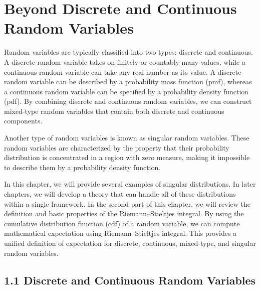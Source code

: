 \section*{Beyond Discrete and Continuous Random Variables}

Random variables are typically classified into two types: discrete and continuous. A discrete random variable takes on finitely or countably many values, while a continuous random variable can take any real number as its value. A discrete random variable can be described by a probability mass function (pmf), whereas a continuous random variable can be specified by a probability density function (pdf). By combining discrete and continuous random variables, we can construct mixed-type random variables that contain both discrete and continuous components.

Another type of random variables is known as singular random variables. These random variables are characterized by the property that their probability distribution is concentrated in a region with zero measure, making it impossible to describe them by a probability density function.

In this chapter, we will provide several examples of singular distributions. In later chapters, we will develop a theory that can handle all of these distributions within a single framework. In the second part of this chapter, we will review the definition and basic properties of the Riemann--Stieltjes integral. By using the cumulative distribution function (cdf) of a random variable, we can compute mathematical expectation using Riemann--Stieltjes integral. This provides a unified definition of expectation for discrete, continuous, mixed-type, and singular random variables.

\subsection*{1.1 Discrete and Continuous Random Variables}

